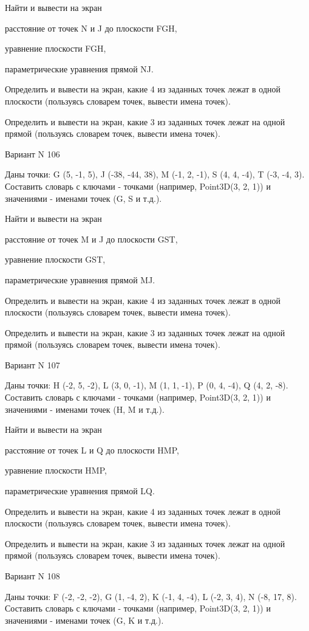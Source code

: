 \documentclass[11pt]{report}
\begin{document}
 
Найти и вывести на экран


расстояние от точек N и J до плоскости FGH,

 
уравнение плоскости FGH,

 
параметрические уравнения прямой NJ.


Определить и вывести на экран, какие 4 из заданных точек лежат в одной плоскости (пользуясь словарем точек, вывести имена точек).


Определить и вывести на экран, какие 3 из заданных точек лежат на одной прямой (пользуясь словарем точек, вывести имена точек).

Вариант N 106

Даны точки: G (5, -1, 5), J (-38, -44, 38), M (-1, 2, -1), S (4, 4, -4), T (-3, -4, 3).
Составить словарь с ключами - точками (например, Point3D(3, 2, 1)) и значениями - именами точек (G, S и т.д.).

 
Найти и вывести на экран


расстояние от точек M и J до плоскости GST,

 
уравнение плоскости GST,

 
параметрические уравнения прямой MJ.


Определить и вывести на экран, какие 4 из заданных точек лежат в одной плоскости (пользуясь словарем точек, вывести имена точек).


Определить и вывести на экран, какие 3 из заданных точек лежат на одной прямой (пользуясь словарем точек, вывести имена точек).

Вариант N 107

Даны точки: H (-2, 5, -2), L (3, 0, -1), M (1, 1, -1), P (0, 4, -4), Q (4, 2, -8).
Составить словарь с ключами - точками (например, Point3D(3, 2, 1)) и значениями - именами точек (H, M и т.д.).

 
Найти и вывести на экран


расстояние от точек L и Q до плоскости HMP,

 
уравнение плоскости HMP,

 
параметрические уравнения прямой LQ.


Определить и вывести на экран, какие 4 из заданных точек лежат в одной плоскости (пользуясь словарем точек, вывести имена точек).


Определить и вывести на экран, какие 3 из заданных точек лежат на одной прямой (пользуясь словарем точек, вывести имена точек).

Вариант N 108

Даны точки: F (-2, -2, -2), G (1, -4, 2), K (-1, 4, -4), L (-2, 3, 4), N (-8, 17, 8).
Составить словарь с ключами - точками (например, Point3D(3, 2, 1)) и значениями - именами точек (G, K и т.д.).
\end{document}

